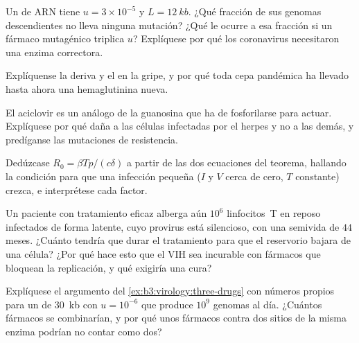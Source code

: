 \begin{exercise}[$\star\star$]\label{exo:b3:virology:7}
Un  de ARN tiene $u = 3\times 10^{-5}$ y $L = \qty{12}{kb}$. ¿Qué
fracción de sus genomas descendientes no lleva ninguna mutación? ¿Qué le
ocurre a esa fracción si un fármaco mutagénico triplica $u$? Explíquese
por qué los coronavirus necesitaron una enzima correctora.
\end{exercise}

\begin{exercise}[$\star\star$]\label{exo:b3:virology:8}
Explíquense la deriva y el  en la gripe, y por qué toda
cepa pandémica ha llevado hasta ahora una hemaglutinina nueva.
\end{exercise}

\begin{exercise}[$\star\star$]\label{exo:b3:virology:9}
El aciclovir es un análogo de la guanosina que ha de fosforilarse para
actuar. Explíquese por qué daña a las células infectadas por el herpes y
no a las demás, y predíganse las mutaciones de resistencia.
\end{exercise}

\begin{exercise}[$\star\star\star$]\label{exo:b3:virology:10}
Dedúzcase $R_{0} = \beta Tp/(c\delta)$ a partir de las dos ecuaciones del
teorema, hallando la condición para que una infección pequeña ($I$ y $V$
cerca de cero, $T$ constante) crezca, e interprétese cada factor.
\end{exercise}

\begin{exercise}[$\star\star\star$]\label{exo:b3:virology:11}
Un paciente con tratamiento eficaz alberga aún $10^{6}$ linfocitos~T en
reposo infectados de forma latente, cuyo provirus está silencioso, con
una semivida de $44$ meses. ¿Cuánto tendría que durar el tratamiento para
que el reservorio bajara de una célula? ¿Por qué hace esto que el VIH sea
incurable con fármacos que bloquean la replicación, y qué exigiría una
cura?
\end{exercise}

\begin{exercise}[$\star\star\star$]\label{exo:b3:virology:12}
Explíquese el argumento del \cref{ex:b3:virology:three-drugs} con números
propios para un  de \qty{30}{kb} con $u = 10^{-6}$ que produce
$10^{9}$ genomas al día. ¿Cuántos fármacos se combinarían, y por qué unos
fármacos contra dos sitios de la misma enzima podrían no contar como dos?
\end{exercise}

